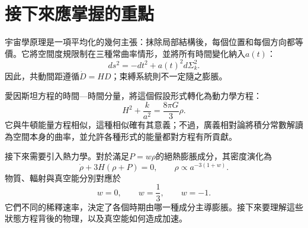 \begin{classroomqa}
\end{classroomqa}

\section{接下來應掌握的重點}

宇宙學原理是一項平均化的幾何主張：抹除局部結構後，每個位置和每個方向都等價。它將空間度規限制在三種常曲率情形，並將所有時間變化納入\(a(t)\)：
\begin{equation}
ds^2=-dt^2+a(t)^2d\Sigma_k^2.
\end{equation}
因此，共動間距遵循\(\dot D=HD\)；束縛系統則不一定隨之膨脹。

愛因斯坦方程的時間—時間分量，將這個假設形式轉化為動力學方程：
\begin{equation}
H^2+\frac{k}{a^2}=\frac{8\pi G}{3}\rho.
\end{equation}
它與牛頓能量方程相似，這種相似確有其意義；不過，廣義相對論將積分常數解讀為空間本身的曲率，並允許各種形式的能量都對方程有所貢獻。

接下來需要引入熱力學。對於滿足\(P=w\rho\)的絕熱膨脹成分，其密度演化為
\begin{equation}
\dot\rho+3H(\rho+P)=0,
\qquad
\rho\propto a^{-3(1+w)}.
\end{equation}
物質、輻射與真空能分別對應於
\begin{equation}
w=0,\qquad w=\frac13,\qquad w=-1.
\end{equation}
它們不同的稀釋速率，決定了各個時期由哪一種成分主導膨脹。接下來要理解這些狀態方程背後的物理，以及真空能如何造成加速。